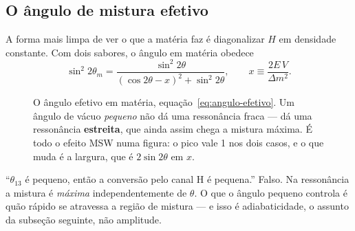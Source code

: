 \subsection{O ângulo de mistura efetivo}

A forma mais limpa de ver o que a matéria faz é diagonalizar
$H$ em densidade constante. Com dois sabores, o ângulo em matéria obedece
\begin{equation}
  \sin^2 2\theta_m = \frac{\sin^2 2\theta}
    {\left(\cos 2\theta - x\right)^2 + \sin^2 2\theta},
  \qquad x \equiv \frac{2E\,V}{\Delta m^2}.
\label{eq:angulo-efetivo}
\end{equation}

\begin{figure}[!htb]
\centering
{}
\caption{O ângulo efetivo em matéria, equação~\eqref{eq:angulo-efetivo}. Um
ângulo de vácuo \emph{pequeno} não dá uma ressonância fraca --- dá uma
ressonância \textbf{estreita}, que ainda assim chega a mistura máxima. É todo o
efeito MSW numa figura: o pico vale 1 nos dois casos, e o que muda é a largura,
que é $2\sin 2\theta$ em $x$.}
\label{fig:angulo-efetivo}
\end{figure}

\begin{alerta}
``$\theta_{13}$ é pequeno, então a conversão pelo canal H é pequena.'' Falso.
Na ressonância a mistura é \emph{máxima} independentemente de $\theta$. O que o
ângulo pequeno controla é quão rápido se atravessa a região de mistura ---
e isso é adiabaticidade, o assunto da subseção seguinte, não amplitude.
\end{alerta}

